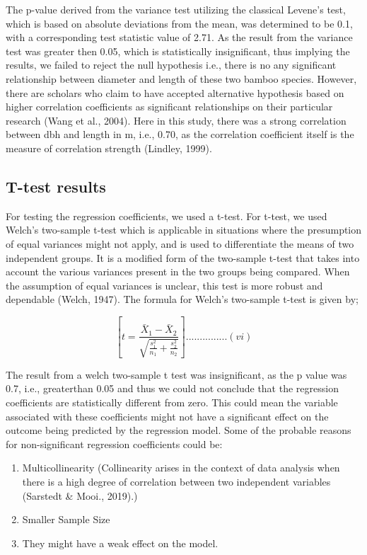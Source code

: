 \documentclass[preprint, 3p,
authoryear]{elsarticle} %
\begin{document}
The p-value derived from the variance test utilizing the classical
Levene's test, which is based on absolute deviations from the mean, was
determined to be 0.1, with a corresponding test statistic value of 2.71.
As the result from the variance test was greater then 0.05, which is
statistically insignificant, thus implying the results, we failed to
reject the null hypothesis i.e., there is no any significant
relationship between diameter and length of these two bamboo species.
However, there are scholars who claim to have accepted alternative
hypothesis based on higher correlation coefficients as significant
relationships on their particular research (Wang et al., 2004). Here in
this study, there was a strong correlation between dbh and length in m,
i.e., 0.70, as the correlation coefficient itself is the measure of
correlation strength (Lindley, 1999).

\hypertarget{t-test-results}{%
\subsection{T-test results}\label{t-test-results}}

For testing the regression coefficients, we used a t-test. For t-test,
we used Welch's two-sample t-test which is applicable in situations
where the presumption of equal variances might not apply, and is used to
differentiate the means of two independent groups. It is a modified form
of the two-sample t-test that takes into account the various variances
present in the two groups being compared. When the assumption of equal
variances is unclear, this test is more robust and dependable (Welch,
1947). The formula for Welch's two-sample t-test is given by;

\[[ t = \frac{{\bar{X}_1 - \bar{X}_2}}{{\sqrt{\frac{{s_1^2}}{{n_1}} + \frac{{s_2^2}}{{n_2}}}}} ]...............(vi) \]

The result from a welch two-sample t test was insignificant, as the p
value was 0.7, i.e., greaterthan 0.05 and thus we could not conclude
that the regression coefficients are statistically different from zero.
This could mean the variable associated with these coefficients might
not have a significant effect on the outcome being predicted by the
regression model. Some of the probable reasons for non-significant
regression coefficients could be:

\begin{enumerate}
\def\labelenumi{\alph{enumi})}
\item
  Multicollinearity (Collinearity arises in the context of data analysis
  when there is a high degree of correlation between two independent
  variables (Sarstedt \& Mooi., 2019).)
\item
  Smaller Sample Size
\item
  They might have a weak effect on the model.
\end{enumerate}
\end{document}
